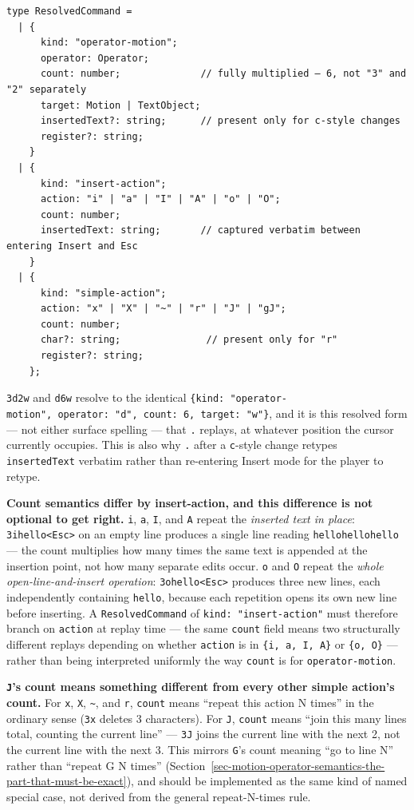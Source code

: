 \documentclass[11pt]{article}
\begin{document}
\begin{Verbatim}[breaklines=true, breakanywhere=true, fontsize=\small]
type ResolvedCommand =
  | {
      kind: "operator-motion";
      operator: Operator;
      count: number;              // fully multiplied — 6, not "3" and "2" separately
      target: Motion | TextObject;
      insertedText?: string;      // present only for c-style changes
      register?: string;
    }
  | {
      kind: "insert-action";
      action: "i" | "a" | "I" | "A" | "o" | "O";
      count: number;
      insertedText: string;       // captured verbatim between entering Insert and Esc
    }
  | {
      kind: "simple-action";
      action: "x" | "X" | "~" | "r" | "J" | "gJ";
      count: number;
      char?: string;               // present only for "r"
      register?: string;
    };
\end{Verbatim}

\texttt{3d2w} and \texttt{d6w} resolve to the identical \texttt{\{kind:\ "operator-motion",\ operator:\ "d",\ count:\ 6,\ target:\ "w"\}}, and it is this resolved form --- not
either surface spelling --- that \texttt{.} replays, at whatever position the
cursor currently occupies. This is also why \texttt{.} after a \texttt{c}-style change
retypes \texttt{insertedText} verbatim rather than re-entering Insert mode for the
player to retype.

\textbf{Count semantics differ by insert-action, and this difference is not
optional to get right.} \texttt{i}, \texttt{a}, \texttt{I}, and \texttt{A} repeat the \emph{inserted text in
place}: \texttt{3ihello\textless{}Esc\textgreater{}} on an empty line produces a single line reading
\texttt{hellohellohello} --- the count multiplies how many times the same text is
appended at the insertion point, not how many separate edits occur. \texttt{o} and
\texttt{O} repeat the \emph{whole open-line-and-insert operation}: \texttt{3ohello\textless{}Esc\textgreater{}}
produces three new lines, each independently containing \texttt{hello}, because
each repetition opens its own new line before inserting. A \texttt{ResolvedCommand}
of \texttt{kind:\ "insert-action"} must therefore branch on \texttt{action} at replay
time --- the same \texttt{count} field means two structurally different replays
depending on whether \texttt{action} is in \texttt{\{i,\ a,\ I,\ A\}} or \texttt{\{o,\ O\}} --- rather than
being interpreted uniformly the way \texttt{count} is for \texttt{operator-motion}.

\textbf{\texttt{J}'s count means something different from every other simple action's
count.} For \texttt{x}, \texttt{X}, \texttt{\textasciitilde{}}, and \texttt{r}, \texttt{count} means ``repeat this action N
times'' in the ordinary sense (\texttt{3x} deletes 3 characters). For \texttt{J}, \texttt{count}
means ``join this many lines total, counting the current line'' --- \texttt{3J} joins
the current line with the next 2, not the current line with the next 3.
This mirrors \texttt{G}'s count meaning ``go to line N'' rather than ``repeat G N
times'' (Section~\ref{sec-motion-operator-semantics-the-part-that-must-be-exact}), and should be implemented as the same kind of named
special case, not derived from the general repeat-N-times rule.
\end{document}
